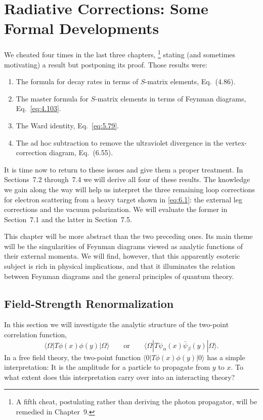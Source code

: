 \chapter{Radiative Corrections: Some Formal Developments}

We cheated four times in the last three chapters,%
\footnote{A fifth cheat, postulating rather than deriving the photon
propagator, will be remedied in Chapter~9.} stating (and sometimes
motivating) a result but postponing its proof.  Those results were:
\begin{enumerate}
  \item The formula for decay rates in terms of $S$-matrix elements,
    Eq.~(4.86).
  \item The master formula for $S$-matrix elements in terms of Feynman
    diagrams, Eq.~\eqref{eq:4.103}.
  \item The Ward identity, Eq.~\eqref{eq:5.79}.
  \item The ad hoc subtraction to remove the ultraviolet divergence in the
    vertex-correction diagram, Eq.~(6.55).
\end{enumerate}
It is time now to return to these issues and give them a proper treatment.
In Sections~7.2 through~7.4 we will derive all four of these results.  The
knowledge we gain along the way will help us interpret the three remaining
loop corrections for electron scattering from a heavy target shown in
\eqref{eq:6.1}: the external leg corrections and the vacuum polarization.  We
will evaluate the former in Section~7.1 and the latter in Section~7.5.

This chapter will be more abstract than the two preceding ones.  Its main
theme will be the singularities of Feynman diagrams viewed as analytic
functions of their external momenta.  We will find, however, that this
apparently esoteric subject is rich in physical implications, and that it
illuminates the relation between Feynman diagrams and the general principles
of quantum theory.

\section{Field-Strength Renormalization}

In this section we will investigate the analytic structure of the two-point
correlation function,
\begin{equation}
  \langle\Omega|T\phi(x)\phi(y)|\Omega\rangle
  \qquad\text{or}\qquad
  \langle\Omega|T\psi_\alpha(x)\bar{\psi}_\beta(y)|\Omega\rangle .
\end{equation}
In a free field theory, the two-point function
$\langle 0|T\phi(x)\phi(y)|0\rangle$ has a simple interpretation: It is the
amplitude for a particle to propagate from $y$ to $x$.  To what extent does
this interpretation carry over into an interacting theory?

